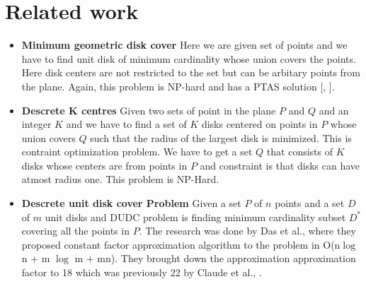 \documentclass[10pt,a4wide]{report}
\theoremstyle{plain}
\theoremstyle{definition}
\theoremstyle{remark}
\begin{document}
\chapter{Related work}
                 \begin{itemize}
                 \item \textbf{Minimum geometric disk cover} Here we are given set of points and we have to find 
                              unit disk of minimum cardinality whose union covers the points. Here disk 
                              centers are not restricted to the set but can be arbitary points from the plane.
                              Again, this problem is NP-hard \cite{FMS81} and has a PTAS solution [\cite{T91}, \cite{DW85}].
                 \item \textbf{Descrete K centres }Given two sets of point in the plane $P$ and $Q$ 
                              and an integer $K$ and we have to find a set of $K$ disks centered on points in $P$ whose union covers
                              $Q$ such that the radius of the largest disk is minimized. This is contraint optimization problem.
                              We have to get a set $Q$ that consists of $K$ disks whose centers are from points in $P$ and constraint is that
                              disks can have atmost radius one. This problem is NP-Hard.
                 \item \textbf{Descrete unit disk cover Problem} Given a set $P$ of $n$ points and a set $D$ of $m$ unit disks and DUDC problem is finding 
                              minimum cardinality subset $D^{\ast}$ covering all the points in $P$\cite{GRALB12}. The research was 
                              done by Das et al., where they proposed constant factor approximation algorithm to the problem in 
                              O(n$\log$ n + m $\log$ m $+$ mn). They brought down the approximation approximation factor to 18 which 
                              was previously 22 by Claude et al., \cite{FGRSR10}.
                 \end{itemize}
\end{document}
